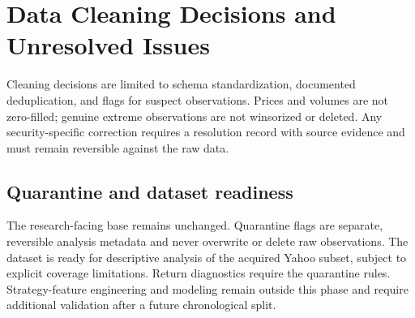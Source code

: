\section{Data Cleaning Decisions and Unresolved Issues}

Cleaning decisions are limited to schema standardization, documented
deduplication, and flags for suspect observations. Prices and volumes are not
zero-filled; genuine extreme observations are not winsorized or deleted. Any
security-specific correction requires a resolution record with source evidence
and must remain reversible against the raw data.



\subsection{Quarantine and dataset readiness}



The research-facing base remains unchanged. Quarantine flags are separate,
reversible analysis metadata and never overwrite or delete raw observations.
The dataset is ready for descriptive analysis of the acquired Yahoo subset,
subject to explicit coverage limitations. Return diagnostics require the
quarantine rules. Strategy-feature engineering and modeling remain outside this
phase and require additional validation after a future chronological split.
